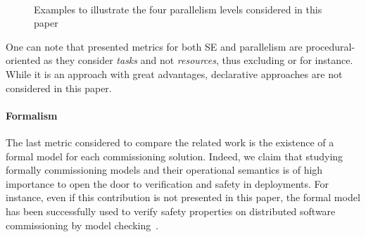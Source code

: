 \begin{figure*}[t!]
  \begin{center}
    \\

    \caption{Examples to illustrate the four parallelism levels
      considered in this paper}
    \label{fig:parlevels}
  \end{center}
\end{figure*}

One can note that presented metrics for both SE and parallelism are
procedural-oriented as they consider \emph{tasks} and not
\emph{resources}, thus excluding \puppet or \salt for instance. While
it is an approach with great advantages, declarative approaches are
not considered in this paper.

\paragraph{Formalism}
The last metric considered to compare the related work is the existence of a formal model for each commissioning solution. Indeed, we claim that studying formally commissioning models and their operational semantics is of high importance to open the door to verification and safety in deployments. For instance, even if this contribution is not presented in this paper, the formal model \mad has been successfully used to verify safety properties on distributed software commissioning by model checking~\cite{coullon:hal-02323641}.

